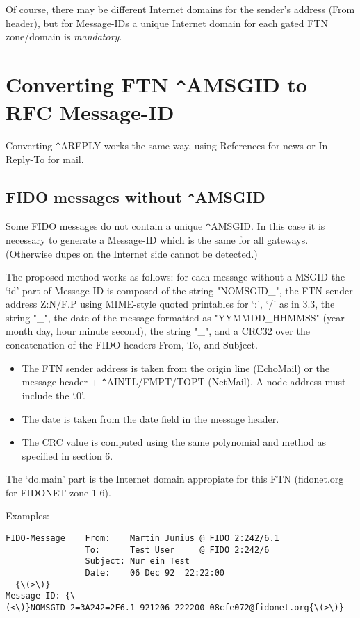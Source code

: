 \documentclass{article}
\begin{document}
Of course, there may be different Internet domains for the sender's address (From header), but for Message-IDs a unique Internet domain for each gated FTN zone/domain is {\itshape mandatory\/}. 


\section{Converting FTN \verb+^+AMSGID to RFC Message-ID }



Converting \verb+^+AREPLY works the same way, using References for news or In-Reply-To for mail. 


\subsection{FIDO messages without \verb+^+AMSGID }



Some FIDO messages do not contain a unique \verb+^+AMSGID. In this case it is necessary to generate a Message-ID which is the same for all gateways. (Otherwise dupes on the Internet side cannot be detected.)

The proposed method works as follows: for each message without a MSGID the `id' part of Message-ID is composed of the string "NOMSGID\_", the FTN sender address Z:N/F.P using MIME-style quoted printables for `:', `/' as in 3.3, the string "\_", the date of the message formatted as "YYMMDD\_HHMMSS" (year month day, hour minute second), the string "\_", and a CRC32 over the concatenation of the FIDO headers From, To, and Subject. 
\begin{itemize}
\item The FTN sender address is taken from the origin line (EchoMail) or the message header + \verb+^+AINTL/FMPT/TOPT (NetMail). A node address must include the `.0'.  
\item The date is taken from the date field in the message header.  
\item The CRC value is computed using the same polynomial and method as specified in section 6.   
\end{itemize}


The `do.main' part is the Internet domain appropiate for this FTN (fidonet.org for FIDONET zone 1-6).

Examples:
\begin{verbatim}
FIDO-Message    From:    Martin Junius @ FIDO 2:242/6.1 
                To:      Test User     @ FIDO 2:242/6 
                Subject: Nur ein Test 
                Date:    06 Dec 92  22:22:00 
--{\(>\)} 
Message-ID: {\(<\)}NOMSGID_2=3A242=2F6.1_921206_222200_08cfe072@fidonet.org{\(>\)} 
\end{verbatim}
\end{document}
